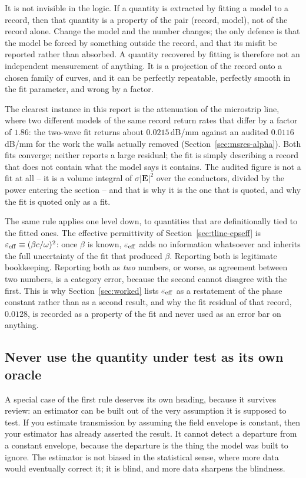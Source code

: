 It is not invisible in the logic. If a quantity is extracted by fitting a model to a record, then that quantity
is a property of the pair (record, model), not of the record alone. Change the model and the number changes; the
only defence is that the model be forced by something outside the record, and that its misfit be reported rather
than absorbed. A quantity recovered by fitting is therefore not an independent measurement of anything. It is a
projection of the record onto a chosen family of curves, and it can be perfectly repeatable, perfectly smooth in
the fit parameter, and wrong by a factor.

The clearest instance in this report is the attenuation of the microstrip line, where two different models of
the same record return rates that differ by a factor of $1.86$: the two-wave fit returns about
$0.0215$\,dB/mm against an audited $0.0116$\,dB/mm for the work the walls actually removed
(Section~\ref{sec:msres-alpha}). Both fits converge; neither reports a large residual; the fit is simply
describing a record that does not contain what the model says it contains. The audited figure is not a fit at
all -- it is a volume integral of $\sigma|\mathbf{E}|^2$ over the conductors, divided by the power entering the
section -- and that is why it is the one that is quoted, and why the fit is quoted only as a fit.

The same rule applies one level down, to quantities that are definitionally tied to the fitted ones. The
effective permittivity of Section~\ref{sec:tline-epseff} is $\varepsilon_{\mathrm{eff}} \equiv (\beta c/\omega)^2$: once
$\beta$ is known, $\varepsilon_{\mathrm{eff}}$ adds no information whatsoever and inherits the full uncertainty of the
fit that produced $\beta$. Reporting both is legitimate bookkeeping. Reporting both as \emph{two} numbers, or
worse, as agreement between two numbers, is a category error, because the second cannot disagree with the first.
This is why Section~\ref{sec:worked} lists $\varepsilon_{\mathrm{eff}}$ as a restatement of the phase constant rather
than as a second result, and why the fit residual of that record, $0.0128$, is recorded as a property of the fit
and never used as an error bar on anything.

\subsection{Never use the quantity under test as its own oracle}
\label{sec:method-oracle}

A special case of the first rule deserves its own heading, because it survives review: an estimator can be
built out of the very assumption it is supposed to test. If you estimate transmission by assuming the field
envelope is constant, then your estimator has already asserted the result. It cannot detect a departure from a
constant envelope, because the departure is the thing the model was built to ignore. The estimator is not
biased in the statistical sense, where more data would eventually correct it; it is blind, and more data
sharpens the blindness.

